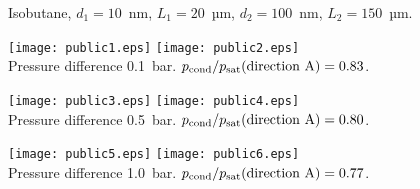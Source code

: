 \documentclass{minimal}
\begin{document}
\centerline{Isobutane, $d_1=10$~nm, $L_1 = 20$~µm, $d_2=100$~nm, $L_2=150$~µm.}

\raggedright\noindent
\texttt{[image: public1.eps]}
\texttt{[image: public2.eps]}\\
Pressure difference 0.1~bar.
$p_\mathrm{cond}/p_\mathrm{sat}(\hbox{direction A}) = 0.83$.
\bigskip

\texttt{[image: public3.eps]}
\texttt{[image: public4.eps]}\\
Pressure difference 0.5~bar.\bigskip
$p_\mathrm{cond}/p_\mathrm{sat}(\hbox{direction A}) = 0.80$.
\bigskip

\texttt{[image: public5.eps]}
\texttt{[image: public6.eps]}\\
Pressure difference 1.0~bar.\bigskip
$p_\mathrm{cond}/p_\mathrm{sat}(\hbox{direction A}) = 0.77$.
\end{document}
